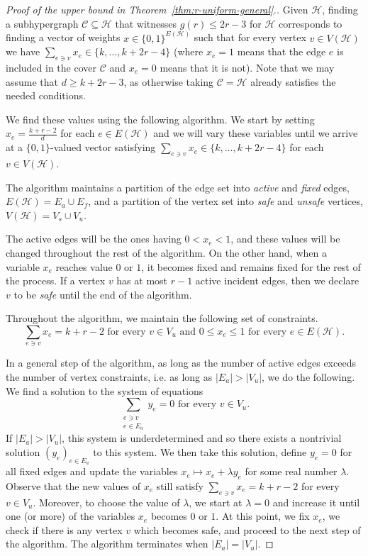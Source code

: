 \documentclass[11pt, a4paper]{article}
\numberwithin{theorem}{section} %
\theoremstyle{remark}
\theoremstyle{definition}
\def\cC{\mathcal{C}}
\def\cH{\mathcal{H}}
\begin{document}
\begin{proof}[Proof of the upper bound in Theorem~\ref{thm:r-uniform-general}.]
Given $\cH$, finding a subhypergraph $\cC\subseteq \cH$ that witnesses $g(r)\leq 2r-3$ for $\cH$ corresponds to finding a vector of weights $x \in \{0, 1\}^{E(\cH)}$ such that for every vertex $v\in V(\cH)$ we have $\sum_{e\ni v} x_e\in \{k, \dots, k+2r-4\}$ (where $x_e=1$ means that the edge $e$ is included in the cover $\cC$ and $x_e=0$ means that it is not). Note that we may assume that $d\geq k+2r-3$, as otherwise taking $\cC=\cH$ already satisfies the needed conditions.

We find these values using the following algorithm. We start by setting $x_e=\frac{k+r-2}{d}$ for each $e\in E(\cH)$ and we will vary these variables until we arrive at a $\{0, 1\}$-valued vector satisfying $\sum_{e\ni v} x_e\in \{k, \dots, k+2r-4\}$ for each $v\in V(\cH)$.

The algorithm maintains a partition of the edge set into \textit{active} and \textit{fixed} edges, $E(\cH)=E_a\cup E_f$, and a partition of the vertex set into \textit{safe} and \textit{unsafe} vertices, $V(\cH)=V_s\cup V_u$.

The active edges will be the ones having $0<x_e<1$, and these values will be changed throughout the rest of the algorithm. On the other hand, when a variable $x_e$ reaches value $0$ or $1$, it becomes fixed and remains fixed for the rest of the process. If a vertex $v$ has at most $r-1$ active incident edges, then we declare $v$ to be \textit{safe} until the end of the algorithm.

Throughout the algorithm, we maintain the following set of constraints.
\[\sum_{e\ni v} x_e=k+r-2\text{ for every }v\in V_u\text{ and }0\leq x_e\leq 1\text{ for every }e\in E(\cH).\]

In a general step of the algorithm, as long as the number of active edges exceeds the number of vertex constraints, i.e. as long as $|E_a|>|V_u|$, we do the following. We find a solution to the system of equations \[\sum_{\substack{e\ni v\\e\in E_a}} y_e=0\text{ for every }v\in V_u.\]
If $|E_a|>|V_u|$, this system is underdetermined and so there exists a nontrivial solution $(y_e)_{e\in E_a}$ to this system. We then take this solution, define $y_e=0$ for all fixed edges and update the variables $x_e\mapsto x_e+\lambda y_e$ for some real number $\lambda$. Observe that the new values of $x_e$ still satisfy $\sum_{e\ni v} x_e=k+r-2$ for every $v\in V_u$. Moreover, to choose the value of $\lambda$, we start at $\lambda=0$ and increase it until one (or more) of the variables $x_e$ becomes $0$ or $1$. At this point, we fix $x_e$, we check if there is any vertex $v$ which becomes safe, and proceed to the next step of the algorithm. The algorithm terminates when $|E_a|=|V_u|$.


\end{proof}
\end{document}
